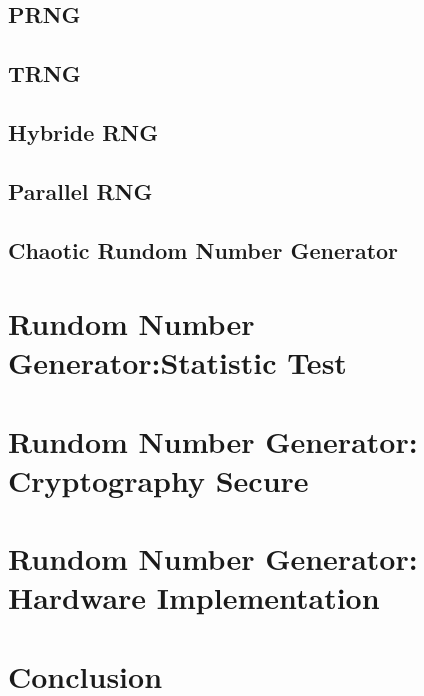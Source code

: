 \documentclass[English, runningheads,a4paper]{llncs}
\begin{document}
\subsection{PRNG}


\subsection{TRNG}


\subsection{Hybride RNG}


\subsection{Parallel RNG}


\subsection{Chaotic Rundom Number Generator}


\section{Rundom Number Generator:Statistic Test }


\section{Rundom Number Generator: Cryptography Secure}


\section{Rundom Number Generator: Hardware Implementation}


\section{Conclusion}

\end{document}
